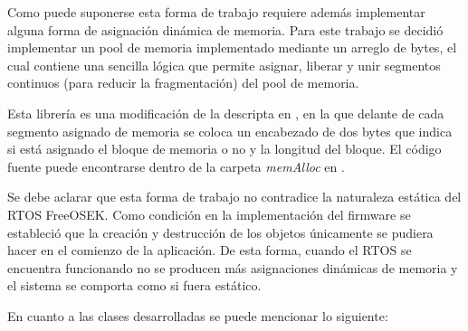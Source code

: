 Como puede suponerse esta forma de trabajo requiere además implementar alguna forma de asignación dinámica de memoria. Para este trabajo se decidió implementar un pool de memoria implementado mediante un arreglo de bytes, el cual contiene una sencilla lógica que permite asignar, liberar y unir segmentos continuos (para reducir la fragmentación) del pool de memoria. 

Esta librería es una modificación de la descripta en \citep{an_microchip_malloc}, en la que delante de cada segmento asignado de memoria se coloca un encabezado de dos bytes que indica si está asignado el bloque de memoria o no y la longitud del bloque. El código fuente puede encontrarse dentro de la carpeta \textit{memAlloc} en \citep{repo_firmware}.

Se debe aclarar que esta forma de trabajo no contradice la naturaleza estática del RTOS FreeOSEK. Como condición en la implementación del firmware se estableció que la creación y destrucción de los objetos únicamente se pudiera hacer en el comienzo de la aplicación. De esta forma, cuando el RTOS se encuentra funcionando no se producen más asignaciones dinámicas de memoria y el sistema se comporta como si fuera estático.

En cuanto a las clases desarrolladas se puede mencionar lo siguiente:

